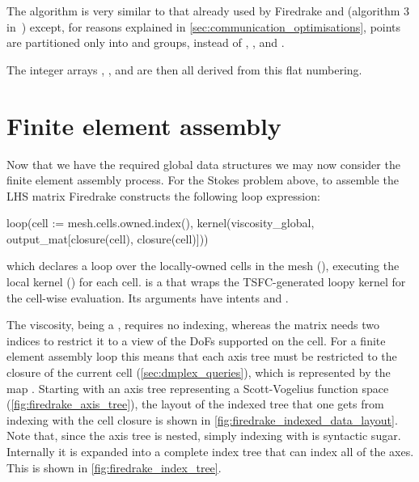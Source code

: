 \documentclass[thesis]{subfiles}
\begin{document}
The algorithm is very similar to that already used by Firedrake and  (algorithm 3 in~\cite{langeEfficientMeshManagement2016}) except, for reasons explained in \cref{sec:communication_optimisations}, points are partitioned only into \ownediter{} and \ghostiter{} groups, instead of \coreiter{}, \ownediter{}, and \ghostiter{}.

The integer arrays , , and  are then all derived from this flat numbering.

\section{Finite element assembly}
\label{sec:firedrake_assembly}

Now that we have the required global data structures we may now consider the finite element assembly process.
For the Stokes problem above, to assemble the LHS matrix Firedrake constructs the following  loop expression:
\begin{pyinline}
  loop(cell := mesh.cells.owned.index(),
       kernel(viscosity_global,
              output_mat[closure(cell), closure(cell)]))
\end{pyinline}
which declares a loop over the locally-owned cells in the mesh (), executing the local kernel () for each cell.
 is a   that wraps the TSFC-generated loopy kernel for the cell-wise evaluation.
Its arguments have intents  and .

The viscosity, being a , requires no indexing, whereas the matrix needs two indices to restrict it to a view of the DoFs supported on the cell.
For a finite element assembly loop this means that each axis tree must be restricted to the closure of the current cell (\cref{sec:dmplex_queries}), which is represented by the map .
Starting with an axis tree representing a Scott-Vogelius function space (\cref{fig:firedrake_axis_tree}), the layout of the indexed tree that one gets from indexing with the cell closure is shown in \cref{fig:firedrake_indexed_data_layout}.
Note that, since the axis tree is nested, simply indexing with  is syntactic sugar.
Internally it is expanded into a complete index tree that can index all of the axes.
This is shown in \cref{fig:firedrake_index_tree}.
\end{document}
